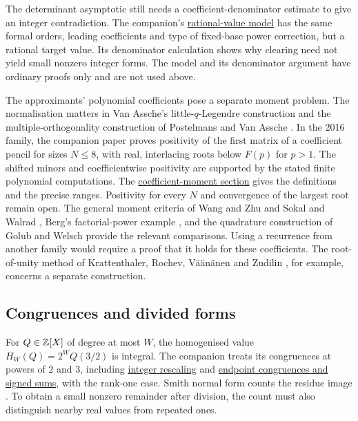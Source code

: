 \documentclass[11pt]{article}
\newcommand{\shortrecordlink}[3]{\href{#1\##2}{#3}}
\begin{document}
The determinant asymptotic still needs a coefficient-denominator
estimate to give an integer contradiction. The companion's
\shortrecordlink{erdos1049-rational-base-lambert-reasoning-surface.pdf}
{long1049-countermodel}{rational-value model}
has the same formal orders, leading coefficients and type of
fixed-base power correction, but a rational target value. Its
denominator calculation shows why clearing need not yield small
nonzero integer forms. The model and its denominator argument have ordinary proofs only
and are not used above.

The approximants' polynomial coefficients pose a separate moment
problem. The normalisation matters in Van Assche's little-$q$-Legendre
construction \cite[\S3]{vanassche2001} and the multiple-orthogonality
construction of Postelmans and Van Assche
\cite[\S2]{postelmansvanassche2007}. In the 2016 family, the companion
paper proves positivity of the first matrix of a coefficient pencil
for sizes $N\le8$, with real, interlacing roots below $F(p)$ for
$p>1$. The shifted minors and coefficientwise positivity are supported
by the stated finite polynomial computations. The
\shortrecordlink{erdos1049-rational-base-lambert-reasoning-surface.pdf}
{long1049-coefficients}{coefficient-moment section}
gives the definitions and the precise ranges. Positivity for every
$N$ and convergence of the largest root remain open. The general
moment criteria of Wang and Zhu \cite{wangzhu2016} and Sokal and
Walrad \cite{sw2024}, Berg's factorial-power example
\cite[Theorem~5.1]{berg2007}, and the quadrature construction of Golub
and Welsch \cite{golubwelsch1969} provide the relevant comparisons.
Using a recurrence from another family would require a proof that it
holds for these coefficients. The root-of-unity method of
Krattenthaler, Rochev, V\"a\"an\"anen and Zudilin \cite{krvz2009}, for
example, concerns a separate construction.

\subsection{Congruences and divided forms}\label{sec:round8-transfer-boundaries}

For $Q\in\mathbb{Z}[X]$ of degree at most $W$, the homogenised value
$H_W(Q)=2^WQ(3/2)$ is integral. The companion treats its congruences
at powers of $2$ and $3$, including
\shortrecordlink{erdos1049-rational-base-lambert-reasoning-surface.pdf}
{long1049-arithmetic}{integer rescaling} and
\shortrecordlink{erdos1049-rational-base-lambert-reasoning-surface.pdf}
{long1049-endpoints}{endpoint congruences and signed sums}, with the
rank-one case. Smith normal form counts the residue image
\cite[Theorems~2.3--2.4]{stanley2016}. To obtain a small nonzero
remainder after division, the count must also distinguish nearby
real values from repeated ones.
\end{document}
